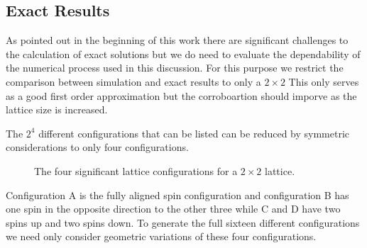 \documentclass[a4paper]{article}
\begin{document}


\subsection{Exact Results}

As pointed out in the beginning of this work there are significant challenges to
the calculation of exact solutions but we do need to evaluate the dependability of the
numerical process used in this discussion. For this purpose we restrict the
comparison between simulation and exact results to only a $2\times2$
This only serves as a good first order approximation but the corroboartion should imporve as the lattice size is increased.
 
The $2^{4}$ different configurations that can be listed can be reduced by
symmetric considerations to only four configurations.
\begin{figure}[htb]
  \centering %
  \caption[]{The four significant lattice configurations for a
    $2\times2$ lattice.}\label{fig:exactconfig}
\end{figure}
Configuration A is the fully aligned spin configuration and configuration 
B has one spin in the opposite direction to the other three while C
and D have two spins up and two spins down. To generate the full sixteen
different configurations we need only consider geometric variations of these
four configurations.
\end{document}
